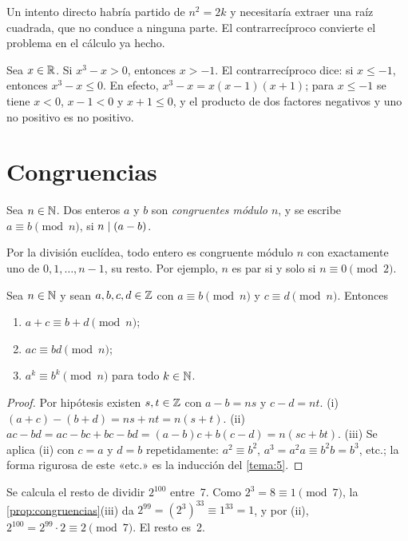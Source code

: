 Un intento directo habría partido de $n^{2}=2k$ y necesitaría extraer una raíz cuadrada, que no conduce a ninguna parte. El contrarrecíproco convierte el problema en el cálculo ya hecho.

\begin{ejemplo}\label{ej:contra-real}
Sea $x\in\mathbb{R}$. Si $x^{3}-x>0$, entonces $x>-1$. El contrarrecíproco dice: si $x\le -1$, entonces $x^{3}-x\le 0$. En efecto, $x^{3}-x=x(x-1)(x+1)$; para $x\le -1$ se tiene $x<0$, $x-1<0$ y $x+1\le 0$, y el producto de dos factores negativos y uno no positivo es no positivo.
\end{ejemplo}

\section{Congruencias}

\begin{definicion}[Congruencia]\label{def:congruencia}
Sea $n\in\mathbb{N}$. Dos enteros $a$ y $b$ son \emph{congruentes módulo $n$}, y se escribe $a\equiv b\pmod n$, si $n\mid(a-b)$.
\end{definicion}

Por la división euclídea, todo entero es congruente módulo $n$ con exactamente uno de $0,1,\dots,n-1$, su resto. Por ejemplo, $n$ es par si y solo si $n\equiv 0\pmod 2$.

\begin{proposicion}\label{prop:congruencias}
Sea $n\in\mathbb{N}$ y sean $a,b,c,d\in\mathbb{Z}$ con $a\equiv b\pmod n$ y $c\equiv d\pmod n$. Entonces
\begin{enumerate}
  \item $a+c\equiv b+d\pmod n$;
  \item $ac\equiv bd\pmod n$;
  \item $a^{k}\equiv b^{k}\pmod n$ para todo $k\in\mathbb{N}$.
\end{enumerate}
\end{proposicion}

\begin{proof}
Por hipótesis existen $s,t\in\mathbb{Z}$ con $a-b=ns$ y $c-d=nt$.
(i) $(a+c)-(b+d)=ns+nt=n(s+t)$.
(ii) $ac-bd=ac-bc+bc-bd=(a-b)c+b(c-d)=n(sc+bt)$.
(iii) Se aplica (ii) con $c=a$ y $d=b$ repetidamente: $a^{2}\equiv b^{2}$, $a^{3}=a^{2}a\equiv b^{2}b=b^{3}$, etc.; la forma rigurosa de este «etc.» es la inducción del \cref{tema:5}.
\end{proof}

\begin{ejemplo}\label{ej:resto-potencia}
Se calcula el resto de dividir $2^{100}$ entre~7. Como $2^{3}=8\equiv 1\pmod 7$, la \cref{prop:congruencias}(iii) da $2^{99}=(2^{3})^{33}\equiv 1^{33}=1$, y por (ii), $2^{100}=2^{99}\cdot 2\equiv 2\pmod 7$. El resto es~2.
\end{ejemplo}

